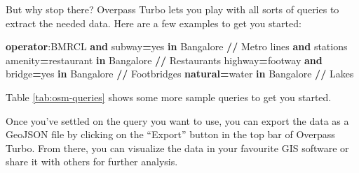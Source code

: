 \documentclass[
]{latex/krantz}
\newenvironment{Shaded}{\begin{snugshade}}{\end{snugshade}}
\newcommand{\CharTok}[1]{\textcolor[rgb]{0.31,0.60,0.02}{#1}}
\newcommand{\KeywordTok}[1]{\textcolor[rgb]{0.13,0.29,0.53}{\textbf{#1}}}
\newcommand{\NormalTok}[1]{#1}
\newcommand{\OperatorTok}[1]{\textcolor[rgb]{0.81,0.36,0.00}{\textbf{#1}}}
\begin{document}
But why stop there? Overpass Turbo lets you play with all sorts of queries to extract the needed data. Here are a few examples to get you started:

\begin{Shaded}
\begin{Highlighting}[]
\KeywordTok{operator}\CharTok{:BMRCL} \KeywordTok{and}\NormalTok{ subway}\OperatorTok{=}\NormalTok{yes }\KeywordTok{in}\NormalTok{ Bangalore    }\OperatorTok{//}\NormalTok{ Metro lines }\KeywordTok{and}\NormalTok{ stations}
\NormalTok{amenity}\OperatorTok{=}\NormalTok{restaurant }\KeywordTok{in}\NormalTok{ Bangalore              }\OperatorTok{//}\NormalTok{ Restaurants}
\NormalTok{highway}\OperatorTok{=}\NormalTok{footway }\KeywordTok{and}\NormalTok{ bridge}\OperatorTok{=}\NormalTok{yes }\KeywordTok{in}\NormalTok{ Bangalore  }\OperatorTok{//}\NormalTok{ Footbridges}
\KeywordTok{natural}\OperatorTok{=}\NormalTok{water }\KeywordTok{in}\NormalTok{ Bangalore                   }\OperatorTok{//}\NormalTok{ Lakes}
\end{Highlighting}
\end{Shaded}

Table \ref{tab:osm-queries} shows some more sample queries to get you started.

Once you've settled on the query you want to use, you can export the data as a GeoJSON file by clicking on the ``Export'' button in the top bar of Overpass Turbo. From there, you can visualize the data in your favourite GIS software or share it with others for further analysis.
\end{document}
